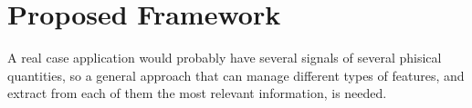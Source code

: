 \chapter{Proposed Framework}
\label{ch:Framework}

A real case application would probably have several signals of several phisical quantities, so a general approach that can manage different types of features, and extract from each of them the most relevant information, is needed.